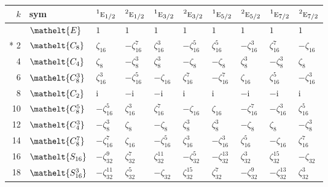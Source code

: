 \documentclass[10pt,a4paper]{article}
\numberwithin{equation}{section}
\newcommand{\eltfont}[1]{{\let\sigma\eltsigma\mathelt{#1}}}
\newcommand{\irr}[1]{\text{\normalfont\scshape #1}}
\newcommand{\conjpair}[1]{{}^{#1}}
\newcommand{\cls}[1]{\eltfont{#1}}
\newcommand{\iunit}{\mathrm{i}}
\newcommand{\rootunity}[1]{\zeta_{#1}}
\begin{document}
{\small\setlength{\tabcolsep}{4pt}
\begin{longtable}{@{}rlllllllll@{}}\toprule
$k$ & sym & $\conjpair{1}\irr{e}_{1/2}$ & $\conjpair{2}\irr{e}_{1/2}$ & $\conjpair{1}\irr{e}_{3/2}$ & $\conjpair{2}\irr{e}_{3/2}$ & $\conjpair{1}\irr{e}_{5/2}$ & $\conjpair{2}\irr{e}_{5/2}$ & $\conjpair{1}\irr{e}_{7/2}$ & $\conjpair{2}\irr{e}_{7/2}$\\\midrule\endhead
\bottomrule\endfoot\endlastfoot
0 & $\cls{E}$ & $1$ & $1$ & $1$ & $1$ & $1$ & $1$ & $1$ & $1$\\*
2 & $\cls{C_{8}}$ & $\rootunity{16}$ & $-\rootunity{16}^{7}$ & $\rootunity{16}^{3}$ & $-\rootunity{16}^{5}$ & $\rootunity{16}^{5}$ & $-\rootunity{16}^{3}$ & $\rootunity{16}^{7}$ & $-\rootunity{16}$\\
4 & $\cls{C_{4}}$ & $\rootunity{8}$ & $-\rootunity{8}^{3}$ & $\rootunity{8}^{3}$ & $-\rootunity{8}$ & $-\rootunity{8}$ & $\rootunity{8}^{3}$ & $-\rootunity{8}^{3}$ & $\rootunity{8}$\\
6 & $\cls{C_{8}^{3}}$ & $\rootunity{16}^{3}$ & $-\rootunity{16}^{5}$ & $-\rootunity{16}$ & $\rootunity{16}^{7}$ & $-\rootunity{16}^{7}$ & $\rootunity{16}$ & $\rootunity{16}^{5}$ & $-\rootunity{16}^{3}$\\
8 & $\cls{C_{2}}$ & $\iunit{}$ & $-\iunit{}$ & $-\iunit{}$ & $\iunit{}$ & $\iunit{}$ & $-\iunit{}$ & $-\iunit{}$ & $\iunit{}$\\
10 & $\cls{C_{8}^{5}}$ & $-\rootunity{16}^{5}$ & $\rootunity{16}^{3}$ & $\rootunity{16}^{7}$ & $-\rootunity{16}$ & $\rootunity{16}$ & $-\rootunity{16}^{7}$ & $-\rootunity{16}^{3}$ & $\rootunity{16}^{5}$\\
12 & $\cls{C_{4}^{3}}$ & $-\rootunity{8}^{3}$ & $\rootunity{8}$ & $-\rootunity{8}$ & $\rootunity{8}^{3}$ & $\rootunity{8}^{3}$ & $-\rootunity{8}$ & $\rootunity{8}$ & $-\rootunity{8}^{3}$\\
14 & $\cls{C_{8}^{7}}$ & $-\rootunity{16}^{7}$ & $\rootunity{16}$ & $-\rootunity{16}^{5}$ & $\rootunity{16}^{3}$ & $-\rootunity{16}^{3}$ & $\rootunity{16}^{5}$ & $-\rootunity{16}$ & $\rootunity{16}^{7}$\\
16 & $\cls{S_{16}}$ & $-\rootunity{32}^{9}$ & $\rootunity{32}^{7}$ & $\rootunity{32}^{11}$ & $-\rootunity{32}^{5}$ & $-\rootunity{32}^{13}$ & $\rootunity{32}^{3}$ & $\rootunity{32}^{15}$ & $-\rootunity{32}$\\
18 & $\cls{S_{16}^{3}}$ & $-\rootunity{32}^{11}$ & $\rootunity{32}^{5}$ & $-\rootunity{32}$ & $\rootunity{32}^{15}$ & $\rootunity{32}^{7}$ & $-\rootunity{32}^{9}$ & $-\rootunity{32}^{13}$ & $\rootunity{32}^{3}$\\

\end{longtable}}
\end{document}
